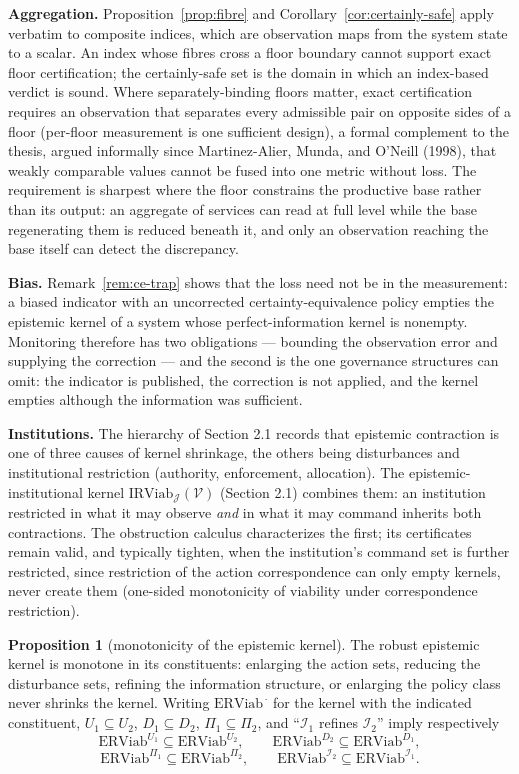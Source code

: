 \documentclass[11pt]{article}
\theoremstyle{definition}
\newtheorem{proposition}{Proposition}
\begin{document}
\textbf{Aggregation.} Proposition~\ref{prop:fibre} and Corollary~\ref{cor:certainly-safe} apply verbatim to
composite indices, which are observation maps from the system state to a
scalar. An index whose fibres cross a floor boundary cannot support
exact floor certification; the certainly-safe set is the domain in which an index-based verdict is sound. Where separately-binding floors matter, exact
certification requires an observation that separates every admissible
pair on opposite sides of a floor (per-floor measurement is one sufficient design), a formal complement to the thesis, argued informally since Martinez-Alier, Munda, and O'Neill (1998), that weakly comparable
values cannot be fused into one metric without loss. The requirement is
sharpest where the floor constrains the productive base rather than its
output: an aggregate of services can read at full level while the base
regenerating them is reduced beneath it, and only an observation
reaching the base itself can detect the discrepancy.

\textbf{Bias.} Remark~\ref{rem:ce-trap} shows that the loss need not be in the
measurement: a biased indicator with an uncorrected
certainty-equivalence policy empties the epistemic kernel of a system
whose perfect-information kernel is nonempty. Monitoring therefore has
two obligations --- bounding the observation error and supplying the
correction --- and the second is the one governance structures can omit: the indicator is published, the correction is not applied,
and the kernel empties although the information was sufficient.

\textbf{Institutions.} The hierarchy of Section 2.1 records that
epistemic contraction is one of three causes of kernel shrinkage, the
others being disturbances and institutional restriction (authority,
enforcement, allocation). The epistemic-institutional kernel \(\mathrm{IRViab}_{\mathcal{J}}(\mathcal{V})\) (Section 2.1) combines them: an institution restricted in what it
may observe \emph{and} in what it may command inherits both
contractions. The obstruction calculus characterizes the first; its certificates remain valid, and typically tighten, when the institution's command set is further restricted, since restriction of
the action correspondence can only empty kernels, never create them
(one-sided monotonicity of viability under correspondence restriction).

\begin{proposition}[monotonicity of the epistemic kernel]\label{prop:monotone}
The robust epistemic kernel is monotone in its constituents: enlarging
the action sets, reducing the disturbance sets, refining the information
structure, or enlarging the policy class never shrinks the kernel.
Writing \(\mathrm{ERViab}^{\,\cdot}\) for the kernel with the indicated
constituent, \(U_1\subseteq U_2\), \(D_1\subseteq D_2\),
\(\Pi_1\subseteq\Pi_2\), and ``\(\mathcal{I}_1\) refines
\(\mathcal{I}_2\)'' imply respectively
\[\mathrm{ERViab}^{U_1} \subseteq \mathrm{ERViab}^{U_2}, \qquad
\mathrm{ERViab}^{D_2} \subseteq \mathrm{ERViab}^{D_1},\]
\[\mathrm{ERViab}^{\Pi_1} \subseteq \mathrm{ERViab}^{\Pi_2}, \qquad
\mathrm{ERViab}^{\mathcal{I}_2} \subseteq \mathrm{ERViab}^{\mathcal{I}_1}.\]
\end{proposition}
\end{document}
